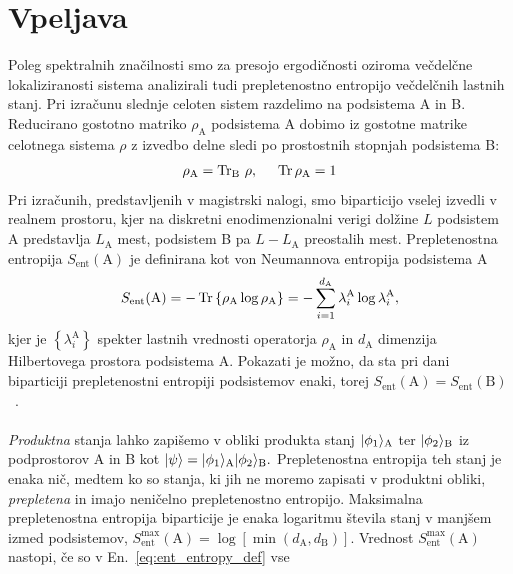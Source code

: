 \section{Vpeljava}
Poleg spektralnih značilnosti smo za presojo ergodičnosti oziroma večdelčne lokaliziranosti sistema analizirali tudi prepletenostno entropijo večdelčnih lastnih stanj. Pri izračunu slednje celoten sistem razdelimo na podsistema A in B. Reducirano gostotno matriko $\rho_\mathrm{A}$ podsistema A dobimo iz gostotne matrike celotnega sistema $\rho$ z izvedbo delne sledi po prostostnih stopnjah podsistema B:
\begin{equation}
\rho_\mathrm{A}=\mathrm{Tr}_\mathrm{B}\ \rho, \hspace{5mm} \mathop{\rm Tr}{\rho_\mathrm{A}}=1
\end{equation}
Pri izračunih, predstavljenih v magistrski nalogi, smo biparticijo vselej izvedli v realnem prostoru, kjer na diskretni enodimenzionalni verigi dolžine $L$ podsistem A predstavlja $L_\mathrm{A}$ mest, podsistem B pa $L-L_\mathrm{A}$ preostalih mest. Prepletenostna entropija $S_\mathrm{ent}(\mathrm{A})$ je definirana kot von Neumannova entropija podsistema A
\begin{equation}\label{eq:ent_entropy_def}
S_\mathrm{ent}(\mathrm{A})=-\mathop{\rm Tr}\left\{\rho_\mathrm{A} \log \rho_\mathrm{A}\right\}=-\sum\limits_{i=1}^{d_\mathrm{A}} \lambda_i^\mathrm{A} \log \lambda_i^\mathrm{A},
\end{equation} 
kjer je $\left\{\lambda_i^\mathrm{A}\right\}$ spekter lastnih vrednosti operatorja $\rho_\mathrm{A}$ in
$d_\mathrm{A}$ dimenzija Hilbertovega prostora podsistema A. Pokazati je možno, da sta pri dani biparticiji prepletenostni entropiji podsistemov enaki, torej $S_\mathrm{ent}(\mathrm{A})=S_\mathrm{ent}(\mathrm{B})$~\cite{grassellientanglement}.\\\\ 
\emph{Produktna} stanja lahko zapišemo v obliki produkta stanj $\vert\phi_1\rangle_\mathrm{A}$ ter $\vert\phi_2\rangle_\mathrm{B}$ iz podprostorov A in B kot $\vert\psi\rangle=\vert\phi_1\rangle_\mathrm{A}\vert\phi_2\rangle_\mathrm{B}.$ Prepletenostna entropija teh stanj je enaka nič, medtem ko so stanja, ki jih ne moremo zapisati v produktni obliki, \emph{prepletena} in imajo neničelno prepletenostno entropijo. Maksimalna prepletenostna entropija biparticije je enaka logaritmu števila stanj v manjšem izmed podsistemov, $S_\mathrm{ent}^\mathrm{max}(\mathrm{A})=\log\left[\min\left(d_\mathrm{A}, d_\mathrm{B}\right)\right].$ Vrednost $S_\mathrm{ent}^\mathrm{max}(\mathrm{A})$ nastopi, če so v En.~\eqref{eq:ent_entropy_def} vse 
